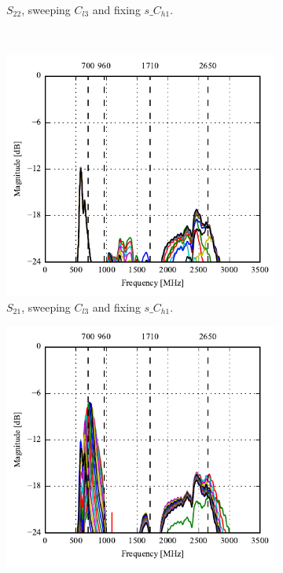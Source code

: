 \begin{figure}[htbp]
\begin{subfigure}[b]{0.49\linewidth}
        \caption{$S_{22}$, sweeping $C_{l3}$ and fixing $s\_C_{h1}$.}
    \end{subfigure}
    \\
    \begin{subfigure}[b]{0.49\linewidth}
        \centering
        \includegraphics{img/tech_sol/nonresonant/simulation/read_mode/s12_top_sweep.pdf}
        \caption{$S_{21}$, sweeping $C_{l3}$ and fixing $s\_C_{h1}$.}
    \end{subfigure}
    \hfill
    \begin{subfigure}[b]{0.49\linewidth}
        \centering
        \includegraphics{img/tech_sol/nonresonant/simulation/read_mode/s21_side_sweep.pdf}

\end{subfigure}
\end{figure}
